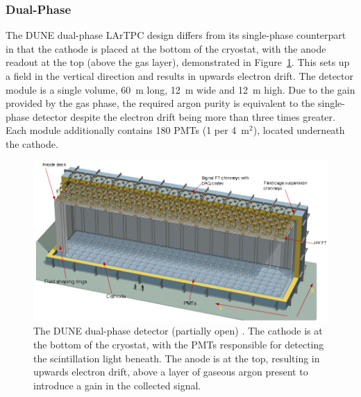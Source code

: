 \subsubsection{Dual-Phase}\label{sec:DUNEDualPhase}

The DUNE dual-phase LArTPC design differs from its single-phase counterpart in that the cathode is placed at the bottom of the cryostat, with the anode readout at the top (above the gas layer), demonstrated in Figure~\ref{fig:DUNEDualPhase}.  This sets up a field in the vertical direction and results in upwards electron drift.  The detector module is a single volume, 60~m long, 12~m wide and 12~m high.  Due to the gain provided by the gas phase, the required argon purity is equivalent to the single-phase detector despite the electron drift being more than three times greater.  Each module additionally contains 180 PMTs (1 per 4~m$^2$), located underneath the cathode.

\begin{figure}
  \centering
  \includegraphics[width=14cm]{DUNEDualPhase.png}
  \caption[The DUNE dual-phase detector (partially open).]{The DUNE dual-phase detector (partially open) \cite{DUNECDR4}.  The cathode is at the bottom of the cryostat, with the PMTs responsible for detecting the scintillation light beneath.  The anode is at the top, resulting in upwards electron drift, above a layer of gaseous argon present to introduce a gain in the collected signal.}
  \label{fig:DUNEDualPhase}
\end{figure}

